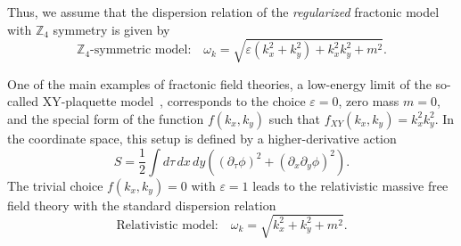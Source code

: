 \documentclass[a4paper,12pt]{article}
\newcommand{\be}{\begin{equation}}
\newcommand{\ee}{\end{equation}}
\newcommand{\skipline}{\vspace{\baselineskip}}
\newcommand{\eps}{\varepsilon}
\newcommand{\om}{\omega}
\newcommand{\Z}[1]{\mathbb{Z}_{#1}}
\begin{document}
\skipline

Thus, we assume that the dispersion relation of the \emph{regularized} fractonic model with $\Z4$ symmetry is given by
\be 
    \Z4\text{-symmetric model:} \quad \om_k = \sqrt{\eps\left(k_x^2 + k_y^2\right) + k_x^2 k_y^2 + m^2}.
    \label{eq:Z4disprel}
\ee

One of the main examples of fractonic field theories, a low-energy limit of the so-called XY-plaquette model~\cite{Seiberg:2020bhn}, corresponds to the choice $\eps = 0$, zero mass $m = 0$, and the special form of the function $f(k_x, k_y)$ such that $f_{XY}(k_x, k_y) = k_x^2 k_y^2$. In the coordinate space, this setup is defined by a higher-derivative action
\be
    S = \frac{1}{2}\int d\tau\,dx\,dy \left((\partial_{\tau}\phi)^2 + (\partial_x\partial_y\phi)^2\right).
    \label{eq:Fracton_action}
\ee
The trivial choice $f(k_x, k_y) = 0$ with $\eps = 1$ leads to the relativistic massive free field theory with the standard dispersion relation
\be 
    \text{Relativistic model:} \quad \om_k = \sqrt{k_x^2 + k_y^2 + m^2}.
    \label{eq:reldisprel}
\ee

\skipline
\end{document}
